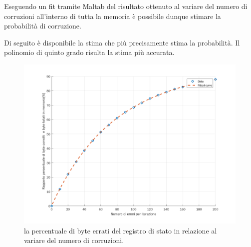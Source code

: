 \documentclass[LaM,binding=0.6cm]{../sapthesis}
\begin{document}
Eseguendo un fit tramite Maltab del risultato ottenuto al variare del numero di corruzioni all'interno di tutta la memoria è possibile dunque stimare la probabilità di corruzione.

Di seguito è disponibile la stima che più precisamente stima la probabilità. Il polinomio di quinto grado risulta la stima più accurata.

\begin{figure}[htbp]
\centerline{\includegraphics[scale=0.6]{examples/scrubbingTestParziali.png}}
\caption{la percentuale di byte errati del registro di stato in relazione al variare del numero di corruzioni.}
\label{fig}
\end{figure}
\vspace{0.5cm}
\newpage
\end{document}
